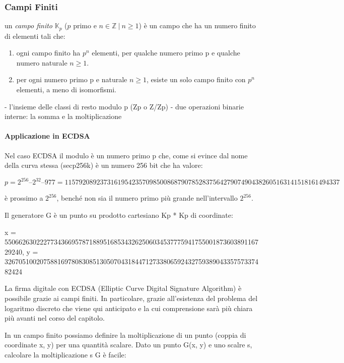 \documentclass{book}
\theoremstyle{definition}
\newcommand{\Kp}{\mathbb{K}_{p}}
\begin{document}
\subsubsection{Campi Finiti}
un \textit{campo finito} $\Kp$ ($p$ primo e $n \in \mathbb{Z} \ | \ n \ge 1$) è un campo che ha un numero finito di elementi tali che:

\begin{enumerate}
    \item ogni campo finito ha $p^{n}$ elementi, per qualche numero primo p e qualche numero naturale $n \ge 1$.
    \item per ogni numero primo p e naturale $n \ge 1$, esiste un solo campo finito con $p^{n}$ elementi, a meno di isomorfismi.
\end{enumerate}



- l'insieme delle classi di resto modulo p (Zp o Z/Zp)
- due operazioni binarie interne: la somma e la moltiplicazione

\paragraph{Applicazione in ECDSA}

Nel caso ECDSA il modulo è un numero primo p che, come si evince dal nome della curva stessa (secp256k) è un numero 256 bit che ha valore:

$$
p = 2^{256} – 2^{32} – 977 = 115792089237316195423570985008687907852837564279074904382605163141518161494337
$$

è prossimo a $2^{256}$, benché non sia il numero primo più grande nell'intervallo $2^{256}$.

Il generatore G è un punto su prodotto cartesiano Kp * Kp di coordinate:

x = 55066263022277343669578718895168534326250603453777594175500187360389116729240,
y = 32670510020758816978083085130507043184471273380659243275938904335757337482424


La firma digitale con ECDSA (Elliptic Curve Digital Signature Algorithm) è possibile grazie ai campi finiti.
In particolare, grazie all'esistenza del problema del logaritmo discreto che viene qui anticipato e la cui comprensione sarà più chiara più avanti nel corso del capitolo.

In un campo finito possiamo definire la moltiplicazione di un punto (coppia di coordinate x, y) per una quantità scalare.
Dato un punto G(x, y) e uno scalre s, calcolare la moltiplicazione s G è facile:
\end{document}
